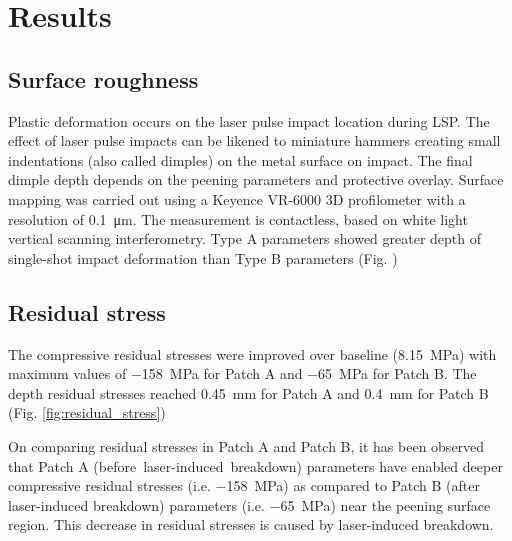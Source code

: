 \documentclass[sn-nature]{sn-jnl}%
\theoremstyle{thmstyleone}%
\theoremstyle{thmstyletwo}%
\theoremstyle{thmstylethree}%
\begin{document}

\section{Results}\label{sec:results}


    \subsection{Surface roughness}

    Plastic deformation occurs on the laser pulse impact location during LSP. The effect of laser pulse impacts can be likened to miniature hammers creating small indentations (also called dimples) on the metal surface on impact. The final dimple depth depends on the peening parameters and protective overlay. Surface mapping was carried out using a Keyence VR-6000 3D profilometer with a resolution of \SI{0.1}{\micro\meter}.  The measurement is contactless, based on white light vertical scanning interferometry. Type A parameters showed greater depth of single-shot impact deformation than Type B parameters (Fig. )



    \subsection{Residual stress}

    The compressive residual stresses were improved over baseline (\SI[]{8.15}{\mega\pascal}) with maximum values of \SI[]{-158}{\mega\pascal} for Patch A and \SI[]{-65}{\mega\pascal} for Patch B. The depth residual stresses reached \SI[]{0.45}{\mm} for Patch A and \SI[]{0.4}{\mm} for Patch B (Fig. \ref{fig:residual_stress})
    
    On comparing residual stresses in Patch A and Patch B, it has been observed that Patch A \mbox{(before laser-induced breakdown)} parameters have enabled deeper compressive residual stresses (i.e. \SI[]{-158}{\mega\pascal}) as compared to Patch B (after laser-induced breakdown) parameters (i.e. \SI[]{-65}{\mega\pascal}) near the peening surface region. This decrease in residual stresses is caused by laser-induced breakdown. 
\end{document}
